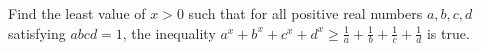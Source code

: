 Find the least value of $x>0$ such that for all positive real numbers $a,b,c,d$ satisfying $abcd=1$, the inequality
$a^x+b^x+c^x+d^x\ge\frac{1}{a}+\frac{1}{b}+\frac{1}{c}+\frac{1}{d}$ is true.